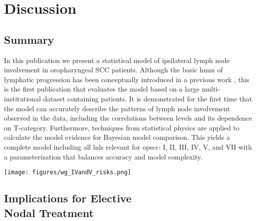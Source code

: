 \documentclass[twocolumn]{article}
\begin{document}
\section{Discussion}
\label{sec:discussion}

\subsection{Summary}

In this publication we present a statistical model of ipsilateral lymph node involvement in oropharyngeal SCC patients. Although the basic \gls{hmm} of lymphatic progression has been conceptually introduced in a previous work \cite{ludwig_hidden_2021}, this is the first publication that evaluates the model based on a large multi-institutional dataset containing patients. It is demonstrated for the first time that the model can accurately describe the patterns of lymph node involvement observed in the data, including the correlations between levels and its dependence on T-category. Furthermore, techniques from statistical physics are applied to calculate the model evidence for Bayesian model comparison. This yields a complete model including all \glspl{lnl} relevant for \gls{opscc}: I, II, III, IV, V, and VII with a parameterization that balances accuracy and model complexity.

\begin{figure*}
    \begin{centering}
        \texttt{[image: figures/wg\_IVandV\_risks.png]}
        \caption{Distributions over the risk for microscopic involvement in \gls{lnl} IV (left panels) and in \gls{lnl} V (right panels) as predicted by the winning graph model, given early (top panels) or advanced T-category (bottom panels), and different CT-based diagnoses: 1) A clinical N0 patient (green histograms), 2) visible metastases in \gls{lnl} II, but otherwise healthy-looking lymph nodes (blue histograms), 3) macroscopic metastases in the \glspl{lnl} II \& III, with the rest of the neck still being clinically node negative (orange histograms), and finally 4) extensive clinical involvement in the levels II, III, and IV (red histograms).\label{fig:wg_IVandV_risks}}
    \end{centering}
\end{figure*}


\subsection{Implications for Elective\\Nodal Treatment}
\end{document}
